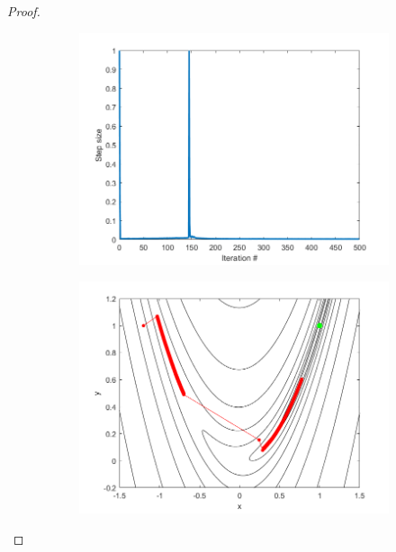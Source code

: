 \documentclass[12pt]{report}
\begin{document}
\begin{problem}
\begin{proof}
        \begin{figure}[H]
            \begin{subfigure}[b]{0.5\linewidth}
                \centering
                \includegraphics[width=\linewidth]{images/4-1-alpha.png}
                \caption{}
                \label{fig4-1:a}
                \vspace{4ex}
            \end{subfigure}%
            \begin{subfigure}[b]{0.5\linewidth}
                \centering
                \includegraphics[width=\linewidth]{images/4-1-contour.png}
                \caption{}
                \label{fig4-1:b}
                \vspace{4ex}

\end{subfigure}
\end{figure}
\end{proof}
\end{problem}
\end{document}
